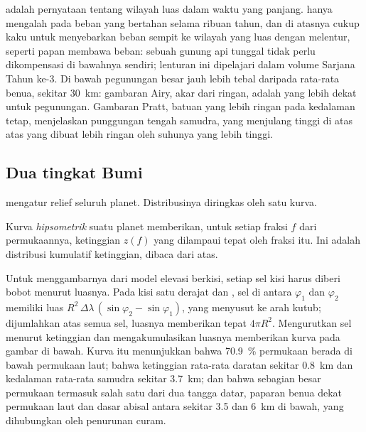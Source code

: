  adalah pernyataan tentang wilayah luas dalam waktu yang panjang.  hanya mengalah pada beban yang bertahan selama ribuan tahun, dan  di atasnya cukup kaku untuk menyebarkan beban sempit ke wilayah yang luas dengan melentur, seperti papan membawa beban: sebuah gunung api tunggal tidak perlu dikompensasi di bawahnya sendiri; lenturan  ini dipelajari dalam volume Sarjana Tahun ke-3. Di bawah pegunungan besar  jauh lebih tebal daripada rata-rata benua, sekitar \qty{30}{km}: gambaran Airy, akar dari  ringan, adalah yang lebih dekat untuk pegunungan. Gambaran Pratt, batuan yang lebih ringan pada kedalaman tetap, menjelaskan punggungan tengah samudra, yang menjulang tinggi di atas  atas yang dibuat lebih ringan oleh suhunya yang lebih tinggi.

\subsection*{Dua tingkat Bumi}

 mengatur relief seluruh planet. Distribusinya diringkas oleh satu kurva.

\begin{definition}\label{def:b1:isostasy-gravity:hypsometry}
Kurva \emph{hipsometrik} suatu planet memberikan, untuk setiap fraksi $f$ dari permukaannya, ketinggian $z(f)$ yang dilampaui tepat oleh fraksi itu. Ini adalah distribusi kumulatif ketinggian, dibaca dari atas.
\end{definition}

Untuk menggambarnya dari model elevasi berkisi, setiap sel kisi harus diberi bobot menurut luasnya. Pada kisi satu derajat  dan , sel di antara  $\varphi_1$ dan $\varphi_2$ memiliki luas
$R^2\,\Delta\lambda\,(\sin\varphi_2 - \sin\varphi_1)$, yang menyusut ke arah kutub; dijumlahkan atas semua sel, luasnya memberikan tepat $4\pi R^2$. Mengurutkan sel menurut ketinggian dan mengakumulasikan luasnya memberikan kurva pada gambar di bawah. Kurva itu menunjukkan bahwa \qty{70.9}{\percent} permukaan berada di bawah permukaan laut; bahwa ketinggian rata-rata daratan sekitar \qty{0.8}{km} dan kedalaman rata-rata samudra sekitar \qty{3.7}{km}; dan bahwa sebagian besar permukaan termasuk salah satu dari dua tangga datar, paparan benua dekat permukaan laut dan dasar abisal antara sekitar 3.5 dan \qty{6}{km} di bawah, yang dihubungkan oleh penurunan curam.

